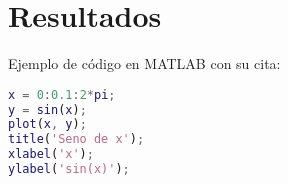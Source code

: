 
\section{Resultados}
Ejemplo de código en MATLAB con su cita:

\begin{lstlisting}[language=Matlab, caption={Vectorización de datos}]
x = 0:0.1:2*pi;
y = sin(x);
plot(x, y);
title('Seno de x');
xlabel('x');
ylabel('sin(x)');
\end{lstlisting}